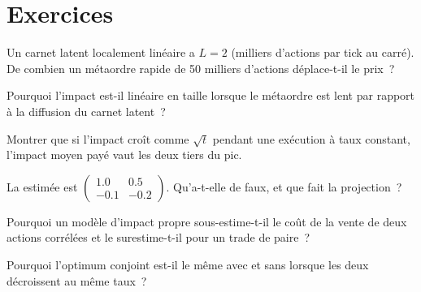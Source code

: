 \section{Exercices}

\begin{exercise}[$\star$]\label{exo:mx:metaorders-latent-liquidity-and-cross-impact:1}
Un carnet latent localement linéaire a $L=2$ (milliers d'actions par tick au carré). De combien un métaordre rapide de 50 milliers d'actions déplace-t-il le prix~?
\end{exercise}

\begin{exercise}[$\star$]\label{exo:mx:metaorders-latent-liquidity-and-cross-impact:2}
Pourquoi l'impact est-il linéaire en taille lorsque le métaordre est lent par rapport à la diffusion du carnet latent~?
\end{exercise}

\begin{exercise}[$\star$]\label{exo:mx:metaorders-latent-liquidity-and-cross-impact:3}
Montrer que si l'impact croît comme $\sqrt t$ pendant une exécution à taux constant, l'impact moyen payé vaut les deux tiers du pic.
\end{exercise}

\begin{exercise}[$\star\star$]\label{exo:mx:metaorders-latent-liquidity-and-cross-impact:4}
La  estimée est $\begin{pmatrix}1.0&0.5\\-0.1&-0.2\end{pmatrix}$. Qu'a-t-elle de faux, et que fait la projection~?
\end{exercise}

\begin{exercise}[$\star\star$]\label{exo:mx:metaorders-latent-liquidity-and-cross-impact:5}
Pourquoi un modèle d'impact propre sous-estime-t-il le coût de la vente de deux actions corrélées et le surestime-t-il pour un trade de paire~?
\end{exercise}

\begin{exercise}[$\star\star$]\label{exo:mx:metaorders-latent-liquidity-and-cross-impact:6}
Pourquoi l'optimum conjoint est-il le même avec et sans  lorsque les deux décroissent au même taux~?
\end{exercise}

